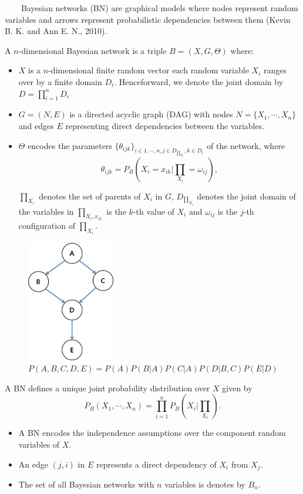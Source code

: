 ~~~~Bayesian networks (BN) are graphical models where nodes represent random variables and arrows represent probabilistic dependencies
between them (Kevin B. K. and Ann E. N., 2010).

A $n$-dimensional Bayesian network is a triple $B = (X, G, \Theta)$ where:

\begin{itemize}
	\item $X$ is a $n$-dimensional finite random vector each random variable $X_{i}$ ranges over by a finite domain $D_{i}$. Henceforward, we denote the joint domain by $D=\prod_{i=1}^{n}D_{i}$
	
	\item $G = (N, E)$ is a directed acyclic graph (DAG) with nodes $N = \{X_{1}, \cdots, X_{n}\}$ and edges $E$ representing direct dependencies between the variables.
	
	\item $\Theta$ encodes the parameters $\{\theta_{ijk}\}_{i\in1,\cdots,n,j\in D_{\prod_{X_{i}}},k\in D_{i}}$ of the network, where
	$$\theta_{ijk}=P_{B}(X_{i}=x_{ik}|\prod_{X_{i}}=\omega_{ij}),$$
	
	$\prod_{X_{i}}$ denotes the set of parents of $X_{i}$ in $G$, $D_{\prod_{X_{i}}}$ denotes the joint domain of the variables in $\prod_{X_{i}, x_{ik}}$ is the $k$-th value of $X_{i}$ and $\omega_{ij}$ is the $j$-th configuration of $\prod_{X_{i}}$.
\end{itemize}

\begin{figure}[!h]
	\centering
		\includegraphics[height=150pt]{image01}
		\caption{$P(A,B,C,D,E)=P(A)P(B|A)P(C|A)P(D|B,C)P(E|D)$}
\end{figure}	

A BN defines a unique joint probability distribution over $X$ given by
$$P_{B}(X_{1},\cdots,X_{n})=\prod_{i=1}^{n}P_{B}(X_{i}|\prod_{X_{i}}).$$

\begin{itemize}
	\item A BN encodes the independence assumptions over the component random variables of $X$.
	
	\item An edge $(j, i)$ in $E$ represents a direct dependency of $X_{i}$ from $X_{j}$.
	
	\item The set of all Bayesian networks with $n$ variables is denotes by $B_{n}$.
\end{itemize}
